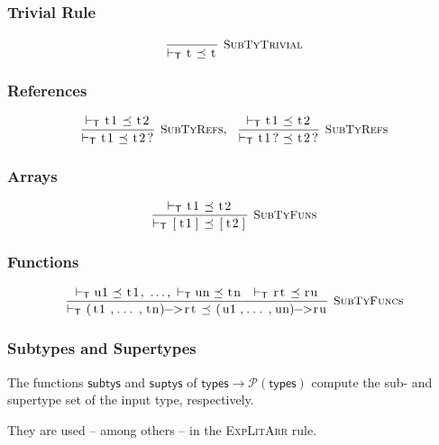 \documentclass{article}
\newcommand{\code}[1]{\lstinline[columns=fixed]{#1}}
\newcommand{\drmrule}[5]{\frac{#1}{#2\vdash_{\mathsf{#3}}#4}\textsc{\ \small{#5}}}
\newcommand{\ruleapp}[1]{\vdash_{\mathsf{#1}}}
\newcommand{\mc}[1]{\textnormal{\code{#1}}}
\begin{document}
			\subsubsection{Trivial Rule}
			
				\begin{align*}
					\drmrule{}{}{T}{\mc{t} \preceq \mc{t}}{SubTyTrivial}
				\end{align*}
				
			\subsubsection{References}
			
				\begin{align*}
					\drmrule{\ruleapp{T}\mc{t1} \preceq \mc{t2}}{}{T}{\mc{t1} \preceq \mc{t2?}}{SubTyRefs},\ \ 
					\drmrule{\ruleapp{T}\mc{t1}\preceq\mc{t2}}{}{T}{\mc{t1?} \preceq \mc{t2?}}{SubTyRefs}
				\end{align*}
				
			\subsubsection{Arrays}
			
				\begin{align*}
					\drmrule{\ruleapp{T}\mc{t1}\preceq\mc{t2}}{}{T}{\mc{[t1]}\preceq\mc{[t2]}}{SubTyFuns}
				\end{align*}
		
			\subsubsection{Functions}
			
				\begin{align*}
					\drmrule{\ruleapp{T}\mc{u1}\preceq\mc{t1},\ \dots,\ \ruleapp{T}\mc{un}\preceq\mc{tn}\ \ \ruleapp{T}\mc{rt}\preceq\mc{ru}}{}{T}{\mc{(t1,...,tn)->rt} \preceq \mc{(u1,...,un)->ru}}{SubTyFuncs}
				\end{align*}
				
			\subsubsection{Subtypes and Supertypes}
			
				The functions $\mathsf{subtys}$ and $\mathsf{suptys}$ of $\mathsf{types}\to\mathcal{P}(\mathsf{types})$ compute the sub- and supertype set of the input type, respectively.
				
				They are used -- among others -- in the \textsc{ExpLitArr} rule.
				
\end{document}
